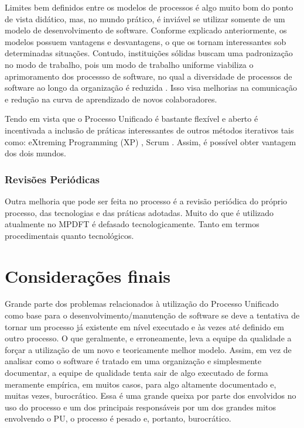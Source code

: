 \documentclass[
	article,			%
	11pt,				%
	oneside,			%
	a4paper,			%
	english,			%
	brazil,				%
	sumario=tradicional
	]{abntex2}
\begin{document}
Limites bem definidos entre os modelos de processos é algo muito bom do ponto de
vista didático, mas, no mundo prático, é inviável se utilizar somente de um
modelo de desenvolvimento de software. Conforme explicado anteriormente, os
modelos possuem vantagens e desvantagens, o que os tornam interessantes sob
determinadas situações. Contudo, instituições sólidas buscam uma padronização no
modo de trabalho, pois um modo de trabalho uniforme viabiliza o aprimoramento
dos processso de software, no qual a diversidade de processos de software ao
longo da organização é reduzida \cite{sommerville2007}. Isso visa melhorias na
comunicação e redução na curva de aprendizado de novos colaboradores.

Tendo em vista que o Processo Unificado é bastante flexível e aberto é
incentivada a inclusão de práticas interessantes de outros métodos iterativos
tais como: eXtreming Programming (XP) \cite{Beck:1999:ECE:619045.621348}, Scrum
\cite{schwaber2002agile}. Assim, é possível obter vantagem dos dois mundos.

\subsubsection{Revisões Periódicas}

Outra melhoria que pode ser feita no processo é a revisão periódica do próprio
processo, das tecnologias e das práticas adotadas. Muito do que é utilizado
atualmente no MPDFT é defasado tecnologicamente. Tanto em termos procedimentais
quanto tecnológicos.

% 

\section*{Considerações finais}

Grande parte dos problemas relacionados à utilização do Processo Unificado como
base para o desenvolvimento/manutenção de software se deve a tentativa de tornar
um processo já existente em nível executado e às vezes até definido em outro
processo. O que geralmente, e erroneamente, leva a equipe da qualidade a forçar
a utilização de um novo e teoricamente melhor modelo. Assim, em vez de analisar
 como o software é tratado em uma organização e simplesmente documentar, a
equipe de qualidade tenta sair de algo executado de forma meramente empírica, em
muitos casos, para algo altamente documentado e, muitas vezes, burocrático. Essa
é uma grande queixa por parte dos envolvidos no uso do processo e um dos
principais responsáveis por um dos grandes mitos envolvendo o PU, o processo é
pesado e, portanto, burocrático.
\end{document}
